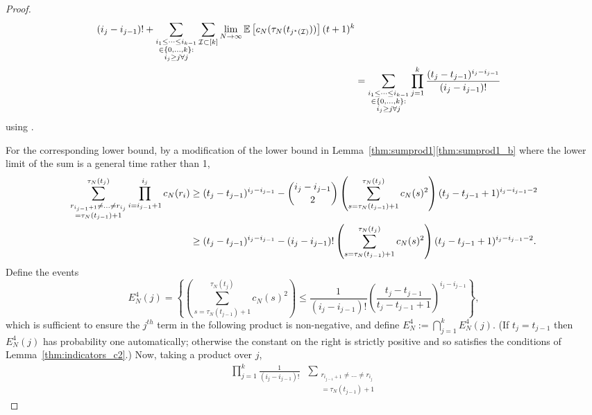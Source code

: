 \documentclass{article}
\newcommand{\E}{\mathbb{E}}
\newcommand{\1}[1]{\mathbbm{1}_{#1}}
\begin{document}
\begin{proof}
\begin{align}
        {(i_j - i_{j-1})!}
        + \sum_{\substack{i_1\leq \dots\leq i_{k-1}\\ \in \{0,\dots,k\} 
        :\\ i_j \geq j \forall j}} \sum_{\mathcal{I} \subset [k]} \lim_{N\to\infty} 
        \E \left[ c_N(\tau_N(t_{j^\star(\mathcal{I})})) \right] 
        (t+1)^k \notag\\
&= \sum_{\substack{i_1\leq \dots\leq i_{k-1}\\ \in \{0,\dots,k\} :\\ 
        i_j \geq j \forall j}} \prod_{j=1}^k \frac{(t_j - t_{j-1})^{i_j - i_{j-1}}}
        {(i_j - i_{j-1})!}
\end{align}
using \citet[Equation (3.3)]{brown2021}.

For the corresponding lower bound, by a modification of the lower bound in Lemma~\ref{thm:sumprod1}\ref{thm:sumprod1_b} where the lower limit of the sum is a general time rather than 1,
\begin{align}
\sum_{\substack{ r_{i_{j-1}+1} \neq \dots \neq r_{i_j} 
        \\ = \tau_N(t_{j-1})+1 }}^{\tau_N(t_j)}
        \prod_{i=i_{j-1}+1}^{i_j} c_N(r_i)
&\geq (t_j - t_{j-1})^{i_j - i_{j-1}}
        - \binom{i_j - i_{j-1}}{2} \left( \sum_{s=\tau_N(t_{j-1})+1}^{\tau_N(t_j)}        
        c_N(s)^2 \right) ( t_j - t_{j-1} +1 )^{i_j - i_{j-1} -2} \notag\\
&\geq (t_j - t_{j-1})^{i_j - i_{j-1}}
        - (i_j - i_{j-1})! \left( \sum_{s=\tau_N(t_{j-1})+1}^{\tau_N(t_j)}
        c_N(s)^2 \right) ( t_j - t_{j-1} +1 )^{i_j - i_{j-1} -2} .
\end{align}
Define the events
\begin{equation}
E_N^4(j)
= \left\{ \left( \sum_{s=\tau_N(t_{j-1})+1}^{\tau_N(t_j)} c_N(s)^2 \right)
        \leq \frac{1}{(i_j - i_{j-1}) !}  \left( \frac{ t_j - t_{j-1} }{ t_j - t_{j-1} +1 }
        \right)^{i_j - i_{j-1}} \right\} ,
\end{equation}
which is sufficient to ensure the $j^{th}$ term in the following product is non-negative,
and define 
$E_N^4 := \bigcap_{j=1}^k E_N^4(j)$.
(If $t_j = t_{j-1}$ then $E_N^4(j)$ has probability one automatically; otherwise the constant on the right is strictly positive and so satisfies the conditions of Lemma~\ref{thm:indicators_c2}.)
Now, taking a product over $j$, 
\begin{align}
\prod_{j=1}^k \frac{1}{(i_j - i_{j-1})!}
        &\sum_{\substack{ r_{i_{j-1}+1} \neq \dots \neq r_{i_j} \\ = \tau_N(t_{j-1})+1}}

\end{align}
\end{proof}
\end{document}
